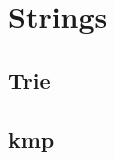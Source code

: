 \documentclass[../Notes/main.tex]{subfiles}
\begin{document}
\section{Strings}

\subsection{Trie}


\subsection{kmp}

\end{document}
